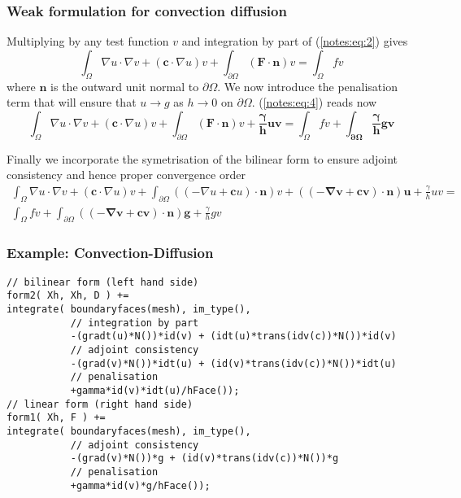 \subsubsection{Weak formulation for convection diffusion}
  Multiplying by any test function $v$ and integration by
  part of (\ref{notes:eq:2}) gives
  \begin{equation}
    \label{notes:eq:4}
    \int_\Omega \nabla u \cdot \nabla v + (\mathbf{c} \cdot \nabla u)v + \int_{\partial \Omega} (\mathbf{F}\cdot \mathbf{n}) v = \int_\Omega f v
  \end{equation}
  where $\mathbf{n}$ is the outward unit normal to $\partial
  \Omega$. We now introduce the penalisation term that will ensure
  that $u \rightarrow g$ as $h \rightarrow 0$ on $\partial \Omega$. (\ref{notes:eq:4}) reads now
  \begin{equation}
    \label{notes:eq:5}
    \int_\Omega \nabla u \cdot \nabla v + (\mathbf{c} \cdot \nabla u)v + \int_{\partial \Omega} (\mathbf{F}\cdot \mathbf{n}) v + \mathbf{\frac{\gamma}{h} u v}  = \int_\Omega f v + \mathbf{\int_{\partial \Omega} \frac{\gamma}{h} g v}
  \end{equation}

  Finally we incorporate the symetrisation of the bilinear form to ensure adjoint consistency and hence proper convergence order
  \begin{equation}
    \label{notes:eq:6}
    \begin{split}
      \int_\Omega \nabla u \cdot \nabla v + (\mathbf{c} \cdot \nabla u)v +
      \int_{\partial \Omega} ((-\nabla u + \mathbf{c} u)\cdot \mathbf{n}) v+ \mathbf{((-\nabla v + \mathbf{c} v)\cdot \mathbf{n}) u} + \frac{\gamma}{h} u v  = \\
      \int_\Omega f v + \int_{\partial \Omega} \mathbf{((-\nabla v + \mathbf{c} v)\cdot \mathbf{n}) g}+ \frac{\gamma}{h} g v
    \end{split}
  \end{equation}


\subsubsection[containsverbatim]{Example: Convection-Diffusion}
  \begin{lstlisting}
// bilinear form (left hand side)
form2( Xh, Xh, D ) +=
integrate( boundaryfaces(mesh), im_type(),
           // integration by part
           -(gradt(u)*N())*id(v) + (idt(u)*trans(idv(c))*N())*id(v)
           // adjoint consistency
           -(grad(v)*N())*idt(u) + (id(v)*trans(idv(c))*N())*idt(u)
           // penalisation
           +gamma*id(v)*idt(u)/hFace());
// linear form (right hand side)
form1( Xh, F ) +=
integrate( boundaryfaces(mesh), im_type(),
           // adjoint consistency
           -(grad(v)*N())*g + (id(v)*trans(idv(c))*N())*g
           // penalisation
           +gamma*id(v)*g/hFace());
  \end{lstlisting}


